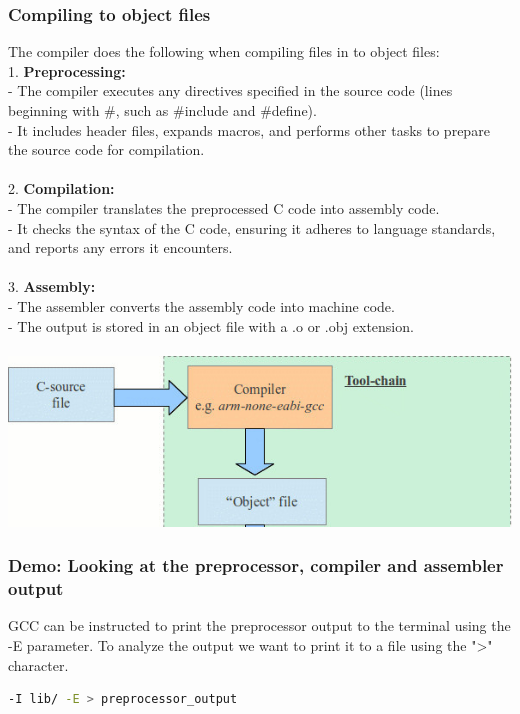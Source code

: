 \documentclass{beamer}
\begin{document}
\begin{frame}
\frametitle{Compiling to object files}
\scriptsize
The compiler does the following when compiling files in to object files: \\
1. \textbf{Preprocessing:} \\
- The compiler executes any directives specified in the source code (lines beginning with \#, such as \#include and \#define). \\
- It includes header files, expands macros, and performs other tasks to prepare the source code for compilation. \\\\
2. \textbf{Compilation:} \\
- The compiler translates the preprocessed C code into assembly code. \\
- It checks the syntax of the C code, ensuring it adheres to language standards, and reports any errors it encounters. \\\\
3. \textbf{Assembly:} \\
- The assembler converts the assembly code into machine code. \\
- The output is stored in an object file with a .o or .obj extension.\\\\
\includegraphics[scale = 0.25]{figures/toolchain_overview_compiling_step.jpg}
\end{frame}

\begin{frame}[fragile]
\frametitle{Demo: Looking at the preprocessor, compiler and assembler output}
GCC can be instructed to print the preprocessor output to the terminal using the -E parameter. To analyze the output we want to print it to a file using the "\textgreater" character.
\begin{lstlisting}[language=bash]
% gcc src/main.c lib/i2c.c lib/spi.c lib/uart.c 
-I lib/ -E > preprocessor_output
\end{lstlisting}
\end{frame}
\end{document}
